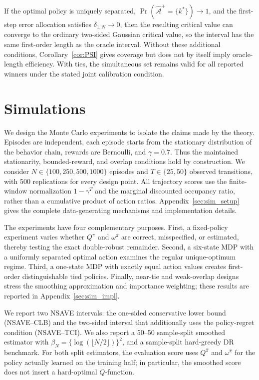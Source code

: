 \documentclass[12pt]{article}
\theoremstyle{remark}\newtheorem{remark}[theorem]{Remark}\theoremstyle{plain}
\begin{document}
If the optimal policy is uniquely separated,
$\Pr(\widehat{\mathcal A}^{+}=\{k^*\})\to1$, and the first-step error
allocation satisfies $\delta_{1,N}\to0$, then the resulting critical
value can converge to the ordinary two-sided Gaussian critical value,
so the interval has the same first-order length as the oracle interval.
Without these additional conditions, Corollary~\ref{cor:PSI} gives
coverage but does not by itself imply oracle-length efficiency.  With
ties, the simultaneous set remains valid for all reported winners
under the stated joint calibration condition.

\section{Simulations}\label{sec:sim}

We design the Monte Carlo experiments to isolate the claims made by the
theory.  Episodes are independent, each episode starts from the stationary
distribution of the behavior chain, rewards are Bernoulli, and
$\gamma=0.7$.  Thus the maintained stationarity, bounded-reward, and overlap
conditions hold by construction.  We consider
$N\in\{100,250,500,1000\}$ episodes and $T\in\{25,50\}$ observed
transitions, with 500 replications for every design point.  All trajectory
scores use the finite-window normalization $1-\gamma^T$ and the marginal
discounted occupancy ratio, rather than a cumulative product of action
ratios.  Appendix~\ref{sec:sim_setup} gives the complete data-generating
mechanisms and implementation details.

The experiments have four complementary purposes.  First, a fixed-policy
experiment varies whether $Q^\pi$ and $\omega^\pi$ are correct, misspecified,
or estimated, thereby testing the exact double-robust remainder.  Second, a
six-state MDP with a uniformly separated optimal action examines the regular
unique-optimum regime.  Third, a one-state MDP with exactly equal action
values creates first-order distinguishable tied policies.  Finally, near-tie
and weak-overlap designs stress the smoothing approximation and importance
weighting; these results are reported in Appendix~\ref{sec:sim_impl}.%


We report two NSAVE intervals: the one-sided conservative lower bound
(NSAVE--CLB) and the two-sided interval that additionally uses the
policy-regret condition (NSAVE--TCI).  We also report a 50--50 sample-split
smoothed estimator with
$\beta_N=\{\log(\lfloor N/2\rfloor)\}^2$, and a sample-split hard-greedy DR
benchmark.  For both split estimators, the evaluation score uses
$Q^{\widehat\pi}$ and $\omega^{\widehat\pi}$ for the policy actually learned
on the training half; in particular, the smoothed score does not insert a
hard-optimal $Q$-function.
\end{document}
